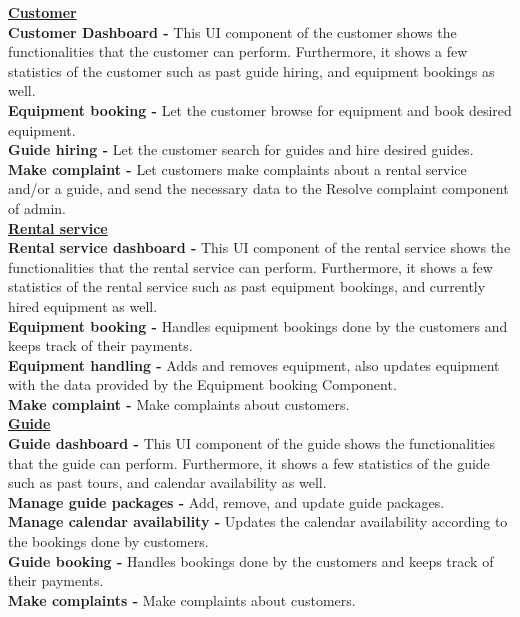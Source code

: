 \underline{\textbf{Customer}}\\
\textbf{Customer Dashboard - }This UI component of the customer shows the functionalities that the customer can perform. Furthermore, it shows a few statistics of the customer such as past guide hiring, and equipment bookings as well.\\
\textbf{Equipment booking - }Let the customer browse for equipment and book desired equipment.\\
\textbf{Guide hiring - }Let the customer search for guides and hire desired guides.\\
\textbf{Make complaint - }Let customers make complaints about a rental service and/or a guide, and send the necessary data to the Resolve complaint component of admin.\\

\underline{\textbf{Rental service }}\\
\textbf{Rental service dashboard - }This UI component of the rental service shows the functionalities that the rental service can perform. Furthermore, it shows a few statistics of the rental service such as past equipment bookings, and currently hired equipment as well.\\
\textbf{Equipment booking - }Handles equipment bookings done by the customers and keeps track of their payments.\\
\textbf{Equipment handling - }Adds and removes equipment, also updates equipment with the data provided by the Equipment booking Component.\\
\textbf{Make complaint - }Make complaints about customers.\\

\underline{\textbf{Guide}}\\
\textbf{Guide dashboard - }This UI component of the guide shows the functionalities that the guide can perform. Furthermore, it shows a few statistics of the guide such as past tours, and calendar availability as well.\\
\textbf{Manage guide packages - }Add, remove, and update guide packages.\\
\textbf{Manage calendar availability - }Updates the calendar availability according to the bookings done by customers.\\
\textbf{Guide booking - }Handles bookings done by the customers and keeps track of their payments.\\
\textbf{Make complaints - }Make complaints about customers.\\

